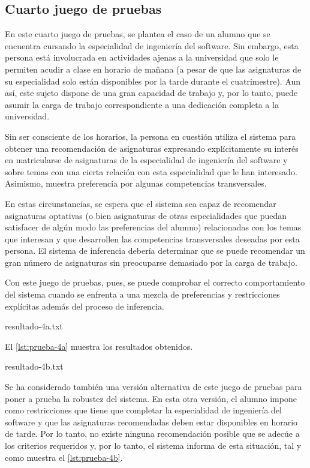 
\subsection{Cuarto juego de pruebas} \label{sec:prueba-4}

En este cuarto juego de pruebas, se plantea el caso de un alumno que se 
encuentra cursando la especialidad de ingeniería del software. Sin embargo, 
esta persona está involucrada en actividades ajenas a la universidad que solo 
le permiten acudir a clase en horario de mañana (a pesar de que las 
asignaturas de su especialidad solo están disponibles por la tarde durante el 
cuatrimestre). Aun así, este sujeto dispone de una gran capacidad de trabajo 
y, por lo tanto, puede asumir la carga de trabajo correspondiente a una 
dedicación completa a la universidad.

Sin ser consciente de los horarios, la persona en cuestión utiliza el sistema 
para obtener una recomendación de asignaturas expresando explícitamente su 
interés en matricularse de asignaturas de la especialidad de ingeniería del 
software y sobre temas con una cierta relación con esta especialidad que le 
han interesado. Asimismo, muestra preferencia por algunas competencias 
transversales.

En estas circunstancias, se espera que el sistema sea capaz de recomendar 
asignaturas optativas (o bien asignaturas de otras especialidades que puedan 
satisfacer de algún modo las preferencias del alumno) relacionadas con los 
temas que interesan y que desarrollen las competencias transversales deseadas 
por esta persona. El sistema de inferencia debería determinar que se puede 
recomendar un gran número de asignaturas sin preocuparse demasiado por la 
carga de trabajo.

Con este juego de pruebas, pues, se puede comprobar el correcto 
comportamiento del sistema cuando se enfrenta a una mezcla de preferencias y 
restricciones explícitas además del proceso de inferencia.

%
    {resultado-4a.txt}

El \autoref{lst:prueba-4a} muestra los resultados obtenidos. 

%
    {resultado-4b.txt}

Se ha considerado también una versión alternativa de este juego de pruebas 
para poner a prueba la robustez del sistema. En esta otra versión, el alumno 
impone como restricciones que tiene que completar la especialidad de 
ingeniería del software y que las asignaturas recomendadas deben estar 
disponibles en horario de tarde. Por lo tanto, no existe ninguna recomendación 
posible que se adecúe a los criterios requeridos y, por lo tanto, el sistema 
informa de esta situación, tal y como muestra el \autoref{lst:prueba-4b}.


